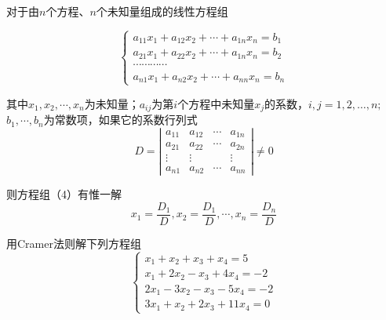 \begin{theorem}
    对于由$n$个方程、$n$个未知量组成的线性方程组

\begin{equation}
    \left\{
    \begin{array}{c}
        a_{11}x_1+a_{12}x_2+\cdots+a_{1n}x_{n}=b_1 \\
        a_{21}x_1+a_{22}x_2+\cdots+a_{1n}x_{n}=b_2 \\
        \cdots\cdots\cdots\cdots                   \\
        a_{n1}x_1+a_{n2}x_2+\cdots+a_{nn}x_{n}=b_n
    \end{array}
    \right.
\end{equation}

其中$x_{1},x_{2},\cdots,x_{n}$为未知量；$a_{ij}$为第$i$个方程中未知量$x_{j}$的系数，$i,j=1,2,…,n;$
$b_{1},\cdots,b_{n}$为常数项，如果它的系数行列式
$$D=
    \left|\begin{array}{ccccc}
        a_{11} & a_{12} & \cdots & a_{1n} \\
        a_{21} & a_{22} & \cdots & a_{2n} \\
        \vdots & \vdots &        & \vdots \\
        a_{n1} & a_{n2} & \cdots & a_{nn}
    \end{array}\right|
    \ne 0
$$

则方程组（4）有惟一解
$$
    x_{1}=\frac{D_{1}}{D},x_{2}=\frac{D_{1}}{D},\cdots,x_{n}=\frac{D_{n}}{D}
$$
\end{theorem}

\begin{example}
    用Cramer法则解下列方程组
\begin{equation}
    \left\{
    \begin{array}{c}
        x_1+x_2+x_3+x_4=5     \\
        x_1+2x_2-x_3+4x_4=-2  \\
        2x_1-3x_2-x_3-5x_4=-2 \\
        3x_1+x_2+2x_3+11x_4=0
    \end{array}
    \right.
\end{equation}
\end{example}

